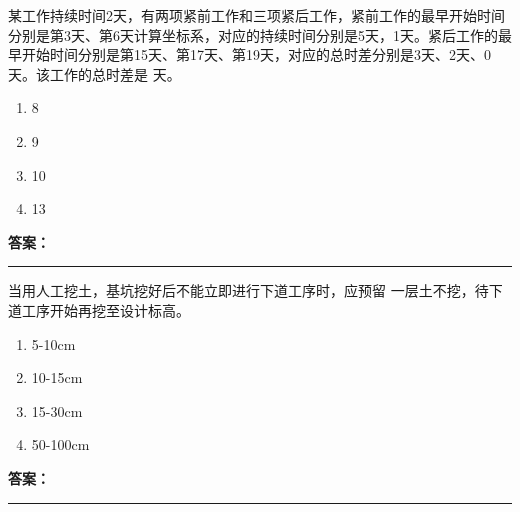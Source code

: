 \documentclass[UTF8,fontset=fandol,11pt]{ctexart}
\newcommand{\answerline}{\textcolor{answerred}{\rule{2.4cm}{0.7pt}}}
\begin{document}
\begin{quizbox}[title={乱序第 101 题｜第十一章网络计划技术}]

某工作持续时间2天，有两项紧前工作和三项紧后工作，紧前工作的最早开始时间分别是第3天、第6天计算坐标系，对应的持续时间分别是5天，1天。紧后工作的最早开始时间分别是第15天、第17天、第19天，对应的总时差分别是3天、2天、0天。该工作的总时差是 天。\\

\begin{enumerate}[label=\Alph*.]

\item 8

\item 9

\item 10

\item 13

\end{enumerate}

\textbf{\textcolor{answerred}{答案：}} \answerline

\end{quizbox}

\vspace{0.2em}

\begin{quizbox}[title={乱序第 102 题｜第一章土方工程}]

当用人工挖土，基坑挖好后不能立即进行下道工序时，应预留 一层土不挖，待下道工序开始再挖至设计标高。\\

\begin{enumerate}[label=\Alph*.]

\item 5-10cm

\item 10-15cm

\item 15-30cm

\item 50-100cm

\end{enumerate}

\textbf{\textcolor{answerred}{答案：}} \answerline

\end{quizbox}

\vspace{0.2em}
\end{document}
